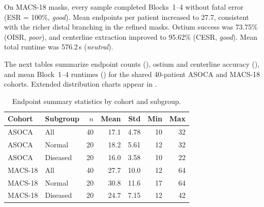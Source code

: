 On MACS-18 masks, every sample completed Blocks~1--4 without fatal error (ESR = 100\%, \emph{good}). Mean endpoints per patient increased to 27.7, consistent with the richer distal branching in the refined masks. Ostium success was 73.75\% (OISR, \emph{poor}), and centerline extraction improved to 95.62\% (CESR, \emph{good}). Mean total runtime was 576.2\,s (\emph{neutral}).

The next tables summarize endpoint counts (), ostium and centerline accuracy (), and mean Block~1--4 runtimes () for the shared 40-patient ASOCA and MACS-18 cohorts. Extended distribution charts appear in .

\begin{table}[H]
  \caption{Endpoint summary statistics by cohort and subgroup.}
  \label{tab:endpoint-summary}
  \vspace{0.5em}
  \centering
  \small
  \renewcommand{\arraystretch}{1.35}
  \setlength{\tabcolsep}{5pt}
  \begin{tabular}{@{}llrrrrr@{}}
    \toprule
    \cellcolor{gray!12}\textbf{Cohort} &
    \cellcolor{gray!12}\textbf{Subgroup} &
    \cellcolor{gray!12}\textbf{$n$} &
    \cellcolor{gray!12}\textbf{Mean} &
    \cellcolor{gray!12}\textbf{Std} &
    \cellcolor{gray!12}\textbf{Min} &
    \cellcolor{gray!12}\textbf{Max} \\
    \midrule
    ASOCA & All & 40 & 17.1 & 4.78 & 10 & 32 \\
    ASOCA & Normal & 20 & 18.2 & 5.61 & 12 & 32 \\
    ASOCA & Diseased & 20 & 16.0 & 3.58 & 10 & 22 \\
    MACS-18 & All & 40 & 27.7 & 10.0 & 12 & 64 \\
    MACS-18 & Normal & 20 & 30.8 & 11.6 & 17 & 64 \\
    MACS-18 & Diseased & 20 & 24.7 & 7.15 & 12 & 42 \\
    \bottomrule
  \end{tabular}
\end{table}

